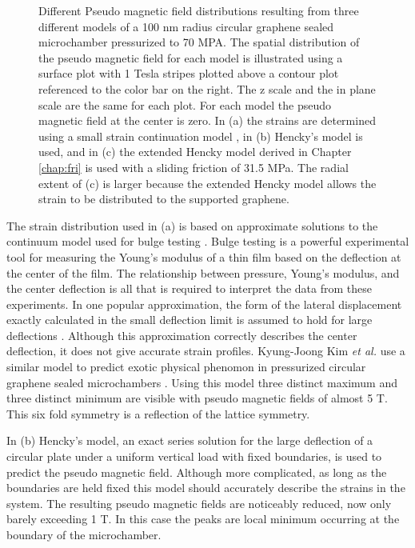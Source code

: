 \begin{figure}
  \begin{center}
  
  \end{center}
  \caption[Different pseudo magnetic field distributions resulting from three different models]{\label{fig:PVP:circle} Different Pseudo magnetic field distributions resulting from three different models of a 100 nm radius circular graphene sealed microchamber pressurized to 70 MPA. The spatial distribution of the pseudo magnetic field for each model is illustrated using a surface plot with 1 Tesla stripes plotted above a contour plot referenced to the color bar on the right. The z scale and the in plane scale are the same for each plot.  For each model the pseudo magnetic field at the center is zero. In (a) the strains are determined using a small strain continuation model \cite{Timoshenko}, in (b) Hencky's model \cite{Hencky1915} is used, and in (c) the extended Hencky model derived in Chapter \ref{chap:fri} is used with a sliding friction of 31.5 MPa.  The radial extent of (c) is larger because the extended Hencky model allows the strain to be distributed to the supported graphene.}
\end{figure}

The strain distribution used in (a) is based on approximate solutions to the continuum model used for bulge testing \cite{Timoshenko}.
Bulge testing is a powerful experimental tool for measuring the Young's modulus of a thin film based on the deflection at the center of the film.
The relationship between pressure, Young's modulus, and the center deflection is all that is required to interpret the data from these experiments.
In one popular approximation, the form of the lateral displacement exactly calculated in the small deflection limit is assumed to hold for large deflections \cite{Timoshenko}. 
Although this approximation correctly describes the center deflection, it does not give accurate strain profiles.
Kyung-Joong Kim \emph{et al.} use a similar model to predict exotic physical phenomon in pressurized circular graphene sealed microchambers \cite{Kim2011b}.
Using this model three distinct maximum and three distinct minimum are visible with pseudo magnetic fields of almost 5 T.
This six fold symmetry is a reflection of the lattice symmetry.

In (b) Hencky's model, an exact series solution for the large deflection of a circular plate under a uniform vertical load with fixed boundaries, is used to predict the pseudo magnetic field.
Although more complicated, as long as the boundaries are held fixed this model should accurately describe the strains in the system.
The resulting pseudo magnetic fields are noticeably reduced, now only barely exceeding 1 T.
In this case the peaks are local minimum occurring at the boundary of the microchamber.

